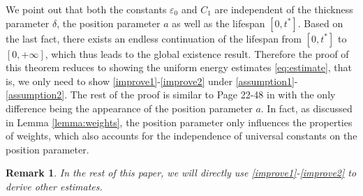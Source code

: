 \documentclass[10pt,reqno]{amsart}
\numberwithin{equation}{section}
\newtheorem{remark}[theorem]{Remark}
\begin{document}
We point out that both the constants $\varepsilon_0$ and $C_1$ are independent of the thickness parameter $\delta$, the position parameter $a$ as well as the lifespan $[0,t^*]$. Based on the last fact, 
there exists an endless continuation of the lifespan from $[0,t^*]$ to $[0,+\infty]$, which thus leads to the global existence result. Therefore  
the proof of  
this theorem reduces to showing the uniform energy estimates \eqref{eq:estimate}, that is, we only need to show \eqref{improve1}-\eqref{improve2} under 
 \eqref{assumption1}-\eqref{assumption2}. The rest of the proof is similar to Page 22-48 in \cite{Xu} with the only difference  
 being the appearance of the position parameter $a$. In fact, as discussed in Lemma \ref{lemma:weights}, the position parameter only influences the properties of weights, which also  
 accounts for the independence of universal constants  
 on the position parameter.  

 
 \begin{remark}
 In the rest of this paper, we will directly use  \eqref{improve1}-\eqref{improve2} to derive other estimates. 
\end{remark}
\end{document}
